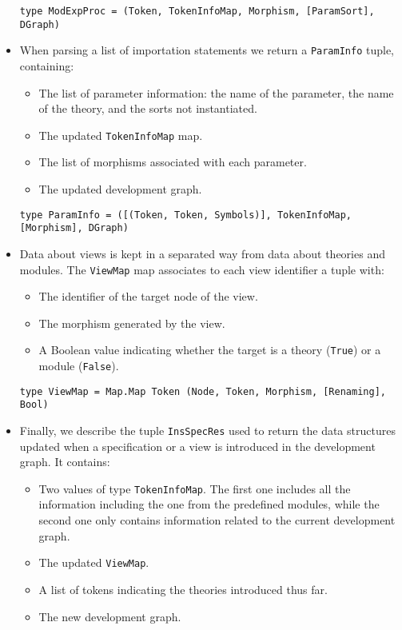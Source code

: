 \begin{itemize}
{\codesize
\begin{verbatim}
type ModExpProc = (Token, TokenInfoMap, Morphism, [ParamSort], DGraph)
\end{verbatim}
}

\item When parsing a list of importation statements we return a
\verb"ParamInfo" tuple, containing:

\begin{itemize}
\item The list of parameter information: the name of the parameter,
the name of the theory, and the sorts not instantiated.
\item The updated \verb"TokenInfoMap" map.
\item The list of morphisms associated with each parameter.
\item The updated development graph.
\end{itemize}

{\codesize
\begin{verbatim}
type ParamInfo = ([(Token, Token, Symbols)], TokenInfoMap, [Morphism], DGraph)
\end{verbatim}
}

\item Data about views is kept in a separated way from data about theories
and modules. The \verb"ViewMap" map associates to each view identifier a
tuple with:

\begin{itemize}
\item The identifier of the target node of the view.
\item The morphism generated by the view.
\item A Boolean value indicating whether the target is a theory
(\verb"True") or a module (\verb"False").
\end{itemize}

{\codesize
\begin{verbatim}
type ViewMap = Map.Map Token (Node, Token, Morphism, [Renaming], Bool)
\end{verbatim}
}

\item Finally, we describe the tuple \verb"InsSpecRes"
used to return the data structures
updated when a specification or a view is introduced in the development
graph. It contains:

\begin{itemize}
\item Two values of type \verb"TokenInfoMap". The first one includes all
the information including the one from the predefined modules, while the
second one only contains information related to the current development
graph.
\item The updated \verb"ViewMap".
\item A list of tokens indicating the theories introduced thus far.
\item The new development graph.
\end{itemize}


\end{itemize}
